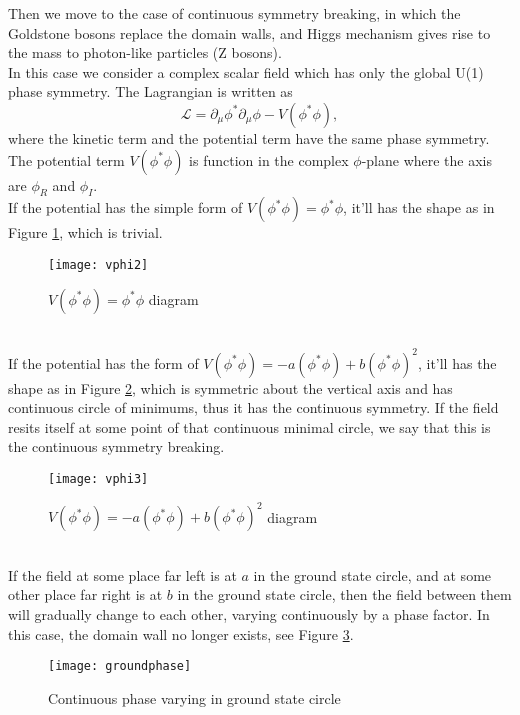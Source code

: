 \documentclass{article}
\newcommand{\be}{\begin{equation}}
\newcommand{\ee}{\end{equation}}
\newcommand{\p}{\partial}
\renewcommand{\1}{\left}
\renewcommand{\2}{\right}
\newcommand{\ma}{\mathcal}
\newcommand{\m}{\mu}
\begin{document}
Then we move to the case of continuous symmetry breaking, in which the Goldstone bosons replace the domain walls, and Higgs mechanism gives rise to the mass to photon-like particles (Z bosons).\\
In this case we consider a complex scalar field which has only the global U(1) phase symmetry. The Lagrangian is written as
\be
\ma L=\p_\m \phi^*\p_\m \phi-V(\phi^*\phi),
\ee
where the kinetic term and the potential term have the same phase symmetry. The potential term $V(\phi^*\phi)$ is function in the complex $\phi$-plane where the axis are $\phi_R$ and $\phi_I$.\\

If the potential has the simple form of $V(\phi^*\phi)=\phi^*\phi$, it'll has the shape as in Figure \ref{vphi2}, which is trivial.
\begin{figure}[h]
\centering
\texttt{[image: vphi2]}
\caption{\label{vphi2}$V(\phi^*\phi)=\phi^*\phi$ diagram}
\end{figure}\\

If the potential has the form of $V(\phi^*\phi)=-a(\phi^*\phi)+b(\phi^*\phi)^2$, it'll has the shape as in Figure \ref{vphi3}, which is symmetric about the vertical axis and has continuous circle of minimums, thus it has the continuous symmetry. If the field resits itself at some point of that continuous minimal circle, we say that this is the continuous symmetry breaking.
\begin{figure}[h]
\centering
\texttt{[image: vphi3]}
\caption{\label{vphi3}$V(\phi^*\phi)=-a(\phi^*\phi)+b(\phi^*\phi)^2$ diagram}
\end{figure}\\

If the field at some place far left is at $a$ in the ground state circle, and at some other place far right is at $b$ in the ground state circle, then the field between them will gradually change to each other, varying continuously by a phase factor. In this case, the domain wall no longer exists, see Figure \ref{gp}.
\begin{figure}[h]
\centering
\texttt{[image: groundphase]}
\caption{\label{gp}Continuous phase varying in ground state circle}
\end{figure}\\
\end{document}
